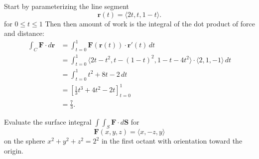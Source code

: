 \documentclass{article}
\newenvironment{problem}[2][Problem]{\begin{trivlist}
\item[\hskip \labelsep {\bfseries #1}\hskip \labelsep {\bfseries #2.}]}{\end{trivlist}}
\newenvironment{solution}[1][Solution.]{\begin{trivlist}
\item[\hskip \labelsep {\bfseries #1}]}{\end{trivlist}}
\begin{document}
\begin{solution} $ $\\
  Start by parameterizing the line segment \[
    \mathbf r(t) = \langle 2t, t, 1 - t\rangle.
  \] for $0 \leq t \leq 1$
  Then then amount of work is the integral of the dot product of force and
  distance: \begin{align*}
    \int_C \mathbf F \cdot d\mathbf r
    &= \int_{t=0}^1 \mathbf F(\mathbf r(t)) \cdot \mathbf r'(t)\,dt \\
    &= \int_{t=0}^1\langle 2t - t^2, t-(1-t)^2, 1 - t - 4t^2 \rangle \cdot \langle 2, 1, -1 \rangle\,dt \\
    &= \int_{t=0}^1 t^2 + 8t -2 \, dt \\
    &= [\frac 13 t^3 + 4t^2 - 2t]_{t=0}^1 \\
    &= \frac 73.
  \end{align*}
\end{solution}
\pagebreak
\begin{problem}{13.7.25}
  Evaluate the surface integral $\int\int_S \mathbf F \cdot d\mathbf S$ for \[
    \mathbf F(x, y, z) = \langle x, -z, y \rangle
  \] on the sphere $x^2 + y^2 + z^2 = 2^2$ in the first octant with orientation
  toward the origin.
\end{problem}
\end{document}
